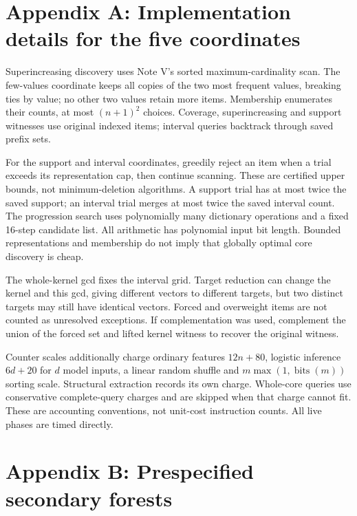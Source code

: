 \documentclass[10pt,english]{article}
\newcommand{\bits}{\operatorname{bits}}
\begin{document}
\appendix
\section{Appendix A: Implementation details for the five coordinates}
Superincreasing discovery uses Note V's sorted maximum-cardinality scan. The few-values coordinate keeps all copies of the two most frequent values, breaking ties by value; no other two values retain more items. Membership enumerates their counts, at most \((n+1)^2\) choices. Coverage, superincreasing and support witnesses use original indexed items; interval queries backtrack through saved prefix sets.

For the support and interval coordinates, greedily reject an item when a trial exceeds its representation cap, then continue scanning. These are certified upper bounds, not minimum-deletion algorithms. A support trial has at most twice the saved support; an interval trial merges at most twice the saved interval count. The progression search uses polynomially many dictionary operations and a fixed 16-step candidate list. All arithmetic has polynomial input bit length. Bounded representations and membership do not imply that globally optimal core discovery is cheap.

The whole-kernel gcd fixes the interval grid. Target reduction can change the kernel and this gcd, giving different vectors to different targets, but two distinct targets may still have identical vectors. Forced and overweight items are not counted as unresolved exceptions. If complementation was used, complement the union of the forced set and lifted kernel witness to recover the original witness.

Counter scales additionally charge ordinary features \(12n+80\), logistic inference \(6d+20\) for \(d\) model inputs, a linear random shuffle and \(m\max(1,\bits(m))\) sorting scale. Structural extraction records its own charge. Whole-core queries use conservative complete-query charges and are skipped when that charge cannot fit. These are accounting conventions, not unit-cost instruction counts. All live phases are timed directly.

\section{Appendix B: Prespecified secondary forests}
\begin{table}[htbp]
\centering\small

\caption{Secondary forest Brier scores on the same fresh reference labels. No secondary model is substituted for the primary logistic model. Full calibration, log-loss, AUC and unresolved-kernel results remain in the saved metrics.}
\end{table}
\end{document}
